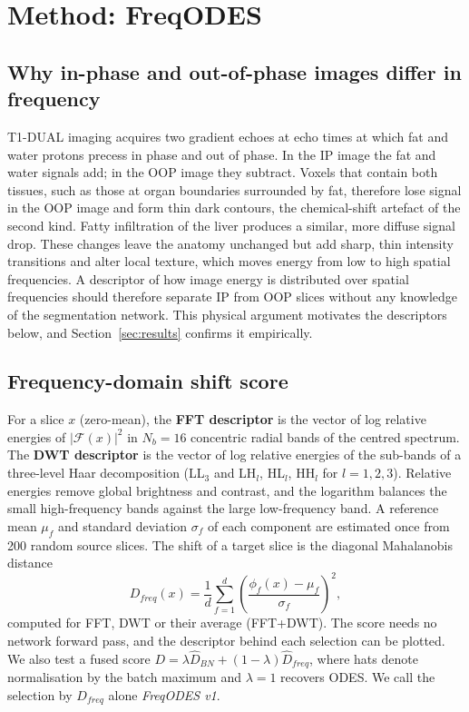 \documentclass[a4paper,fleqn]{cas-dc}
\begin{document}
\section{Method: FreqODES}\label{sec:method}
\subsection{Why in-phase and out-of-phase images differ in frequency}
T1-DUAL imaging acquires two gradient echoes at echo times at which fat and water protons precess in phase and out of phase. In the IP image the fat and water signals add; in the OOP image they subtract. Voxels that contain both tissues, such as those at organ boundaries surrounded by fat, therefore lose signal in the OOP image and form thin dark contours, the chemical-shift artefact of the second kind. Fatty infiltration of the liver produces a similar, more diffuse signal drop. These changes leave the anatomy unchanged but add sharp, thin intensity transitions and alter local texture, which moves energy from low to high spatial frequencies. A descriptor of how image energy is distributed over spatial frequencies should therefore separate IP from OOP slices without any knowledge of the segmentation network. This physical argument motivates the descriptors below, and Section~\ref{sec:results} confirms it empirically.

\subsection{Frequency-domain shift score}
For a slice $x$ (zero-mean), the \textbf{FFT descriptor} is the vector of log relative energies of $|\mathcal{F}(x)|^2$ in $N_b=16$ concentric radial bands of the centred spectrum. The \textbf{DWT descriptor} is the vector of log relative energies of the sub-bands of a three-level Haar decomposition (LL$_3$ and LH$_l$, HL$_l$, HH$_l$ for $l=1,2,3$). Relative energies remove global brightness and contrast, and the logarithm balances the small high-frequency bands against the large low-frequency band. A reference mean $\mu_f$ and standard deviation $\sigma_f$ of each component are estimated once from 200 random source slices. The shift of a target slice is the diagonal Mahalanobis distance
\begin{equation}
D_{freq}(x)=\frac{1}{d}\sum_{f=1}^{d}\left(\frac{\phi_f(x)-\mu_f}{\sigma_f}\right)^2 ,
\label{eq:dfreq}
\end{equation}
computed for FFT, DWT or their average (FFT+DWT). The score needs no network forward pass, and the descriptor behind each selection can be plotted. We also test a fused score $D=\lambda\hat D_{BN}+(1-\lambda)\hat D_{freq}$, where hats denote normalisation by the batch maximum and $\lambda=1$ recovers ODES. We call the selection by $D_{freq}$ alone \emph{FreqODES v1}.
\end{document}
